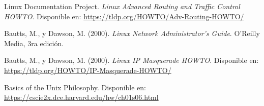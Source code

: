 \documentclass[letterpaper,12pt,oneside]{article}
\begin{document}
\begin{thebibliography}{99}
    Linux Documentation Project. \textit{Linux Advanced Routing and Traffic Control HOWTO}. Disponible en: \url{https://tldp.org/HOWTO/Adv-Routing-HOWTO/}
    
    Bautts, M., y Dawson, M. (2000). \textit{Linux Network Administrator’s Guide}. O’Reilly Media, 3ra edición.
    
    Bautts, M., y Dawson, M. (2000). \textit{Linux IP Masquerade HOWTO}. Disponible en: \url{https://tldp.org/HOWTO/IP-Masquerade-HOWTO/}
    
    Basics of the Unix Philosophy. Disponible en: \url{https://cscie2x.dce.harvard.edu/hw/ch01s06.html}
    
    \end{thebibliography}
\end{document}
